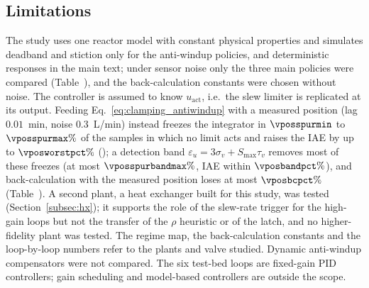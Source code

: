 \subsection{Limitations}
\label{subsec:limitations}
The study uses one reactor model with constant physical properties and simulates deadband and stiction only for the anti-windup policies, and deterministic responses in the main text; under sensor noise only the three main policies were compared (Table~), and the back-calculation constants were chosen without noise. The controller is assumed to know $u_{\text{act}}$, i.e.\ the slew limiter is replicated at its output. Feeding Eq.~\eqref{eq:clamping_antiwindup} with a measured position (lag $0.01$~min, noise $0.3$~L/min) instead freezes the integrator in $\vposspurmin$ to $\vposspurmax\%$ of the samples in which no limit acts and raises the IAE by up to $\vposworstpct\%$ (\vposworstloop{}); a detection band $\varepsilon_u = 3\sigma_v + S_{\max}\tau_v$ removes most of these freezes (at most $\vposspurbandmax\%$, IAE within $\vposbandpct\%$), and back-calculation with the measured position loses at most $\vposbcpct\%$ (Table~). A second plant, a heat exchanger built for this study, was tested (Section~\ref{subsec:hx}); it supports the role of the slew-rate trigger for the high-gain loops but not the transfer of the $\rho$ heuristic or of the latch, and no higher-fidelity plant was tested. The regime map, the back-calculation constants and the loop-by-loop numbers refer to the plants and valve studied. Dynamic anti-windup compensators were not compared. The six test-bed loops are fixed-gain PID controllers; gain scheduling and model-based controllers are outside the scope.
